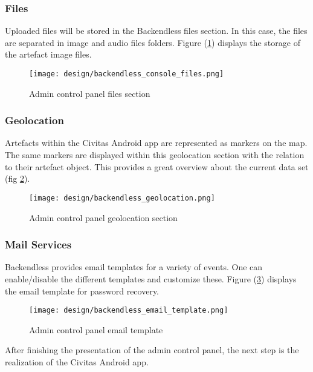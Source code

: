 \subsubsection*{Files}
Uploaded files will be stored in the Backendless files section. In this case, the files are separated in image and audio files folders.  Figure (\ref{fig:backendless_console_files}) displays the storage of the artefact image files. 

\begin{figure}[H]
    \centering \texttt{[image: design/backendless\_console\_files.png]}
    \caption{Admin control panel files section}
    \label{fig:backendless_console_files}
\end{figure}

\subsubsection*{Geolocation}
Artefacts within the Civitas Android app are represented as markers on the map. The same markers are displayed within this geolocation section with the relation to their artefact object. This provides a great overview about the current data set (fig \ref{fig:backendless_geolocation}).

\begin{figure}[H]
    \centering \texttt{[image: design/backendless\_geolocation.png]}
    \caption{Admin control panel geolocation section}
    \label{fig:backendless_geolocation}
\end{figure}

\subsubsection*{Mail Services}
Backendless provides email templates for a variety of events. One can enable/disable the different templates and customize these. Figure (\ref{fig:backendless_email_template}) displays the email template for password recovery.

\begin{figure}[H]
    \centering \texttt{[image: design/backendless\_email\_template.png]}
    \caption{Admin control panel email template}
    \label{fig:backendless_email_template}
\end{figure}


After finishing the presentation of the admin control panel, the next step is the realization of the Civitas Android app.



